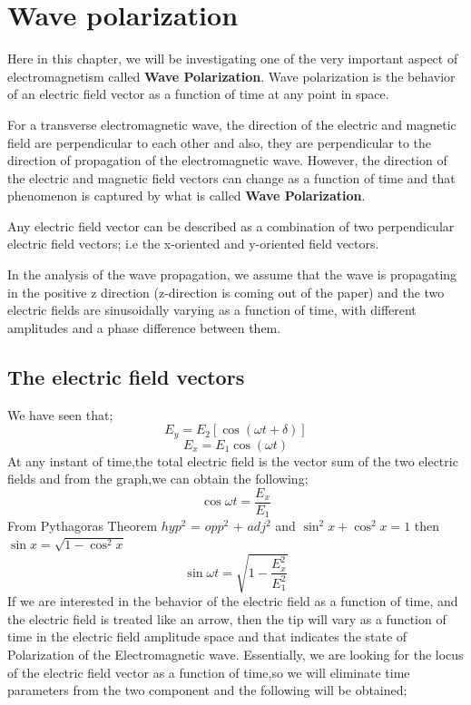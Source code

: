 \chapter{Wave polarization}\label{lec:lec23}
Here in this chapter, we will be investigating one of the very important aspect of electromagnetism called \textbf{Wave Polarization}. Wave polarization is the behavior of an electric field vector as a function of time at any point in space.

For a transverse electromagnetic wave, the direction of the electric and magnetic field are perpendicular to each other and also, they are perpendicular to the direction of propagation of the electromagnetic wave. However, the direction of the electric and magnetic field vectors can change as a function of time and that phenomenon is captured by what is called \textbf{Wave Polarization}.

Any electric field vector can be described as a combination of two perpendicular electric field vectors; i.e the x-oriented and y-oriented field vectors. 

In the analysis of the wave propagation, we assume that the wave is propagating in the positive z direction (z-direction is coming out of the paper) and the two electric fields are sinusoidally varying as a function of time, with different amplitudes and a phase difference between them.	

\section{The electric field vectors} 
We have seen that;
\begin{equation}
E_y = E_2 [\cos(\omega t + \delta)]
\end{equation}
\begin{equation}
E_x = E_1 \cos(\omega t)
\end{equation}
At any instant of time,the total electric field is the vector sum of the two electric  fields and from the graph,we can obtain the following;
\begin{equation}
\cos {\omega t} = \frac {E_x}{E_1} 
\end{equation}
From Pythagoras Theorem $hyp^2$ = $opp^2$ + $adj^2$ and $\sin^2 x + \cos^2 x = 1$ then $\sin x = \sqrt{1-\cos^ 2x}$
\begin{equation}
\sin {\omega t} = \sqrt{1 - \frac{E_{x}^2}{E_{1}^2}}
\end{equation}
If we are interested in the behavior of the electric field as a function of time, and the electric field is treated like an arrow, then the tip will vary as a function of time in the electric field amplitude space and that indicates the state of Polarization of the Electromagnetic wave. Essentially, we are looking for the locus of the electric field vector as a function of time,so we will eliminate time parameters from the two component and the following will be obtained;

